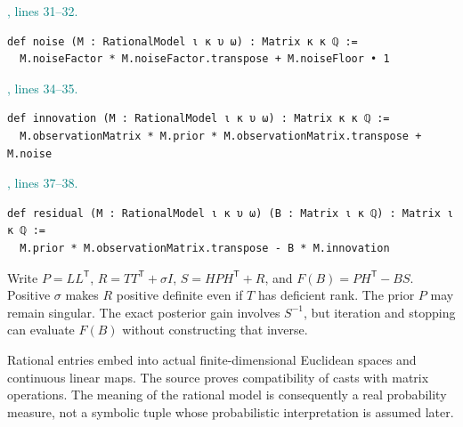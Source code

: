 \documentclass[11pt]{article}\usepackage{needspace}\renewcommand{\paperkind}{Lean companion}\setlength{\parskip}{0.35em}
\begin{document}
{\small\textcolor{teal}{, lines 31--32.}\par}

\begin{lstlisting}[style=BayesSource]
def noise (M : RationalModel ι κ υ ω) : Matrix κ κ ℚ :=
  M.noiseFactor * M.noiseFactor.transpose + M.noiseFloor • 1
\end{lstlisting}



{\small\textcolor{teal}{, lines 34--35.}\par}

\begin{lstlisting}[style=BayesSource]
def innovation (M : RationalModel ι κ υ ω) : Matrix κ κ ℚ :=
  M.observationMatrix * M.prior * M.observationMatrix.transpose + M.noise
\end{lstlisting}



{\small\textcolor{teal}{, lines 37--38.}\par}

\begin{lstlisting}[style=BayesSource]
def residual (M : RationalModel ι κ υ ω) (B : Matrix ι κ ℚ) : Matrix ι κ ℚ :=
  M.prior * M.observationMatrix.transpose - B * M.innovation
\end{lstlisting}

Write $P=LL^{\mathsf T}$, $R=TT^{\mathsf T}+\sigma I$, $S=HPH^{\mathsf T}+R$, and $F(B)=PH^{\mathsf T}-BS$. Positive $\sigma$ makes $R$ positive definite even if $T$ has deficient rank. The prior $P$ may remain singular. The exact posterior gain involves $S^{-1}$, but iteration and stopping can evaluate $F(B)$ without constructing that inverse.

Rational entries embed into actual finite-dimensional Euclidean spaces and continuous linear maps. The source proves compatibility of casts with matrix operations. The meaning of the rational model is consequently a real probability measure, not a symbolic tuple whose probabilistic interpretation is assumed later.
\end{document}
